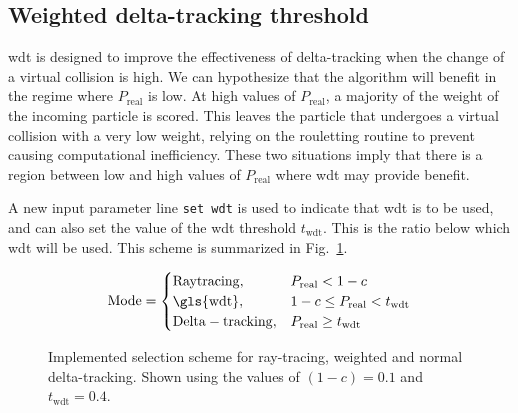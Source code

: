 \subsection{Weighted delta-tracking threshold}
\label{sec:wdt_thresh}

\gls{wdt} is designed to improve the effectiveness of
delta-tracking when the change of a virtual collision is
high. We can hypothesize that the algorithm will benefit in
the regime where $P_{\mathrm{real}}$ is low. At high values of
$P_{\mathrm{real}}$, a majority of the weight of the incoming particle
is scored. This leaves the particle that undergoes a virtual
collision with a very low weight, relying on the rouletting routine to
prevent causing computational inefficiency. These two situations
imply that there is a region between low and high values of
$P_\mathrm{real}$ where \gls{wdt} may provide benefit.

A new input parameter line \verb|set wdt| is used to indicate that
\gls{wdt} is to be used, and can also set the value of the \gls{wdt}
threshold $t_{\mathrm{wdt}}$. This is the ratio below which \gls{wdt} will be used. This
scheme is summarized in Fig.~\ref{fig:ray_wdt}.
\begin{figure}[hbtp]
  \centering
  \begin{align*}
    \mathrm{Mode} =
    \begin{cases}
      \mathrm{Ray tracing}, & P_\mathrm{real} < 1-c \\
      \mathrm{\gls{wdt}}, & 1-c \leq P_\mathrm{real} < t_{\mathrm{wdt}}
      \\
      \mathrm{Delta-tracking}, & P_\mathrm{real} \geq t_{\mathrm{wdt}}
    \end{cases}
  \end{align*}
  \caption[Implemented selection scheme for ray-tracing, weighted and normal
    delta-tracking.]{Implemented selection scheme for ray-tracing, weighted and normal
    delta-tracking. Shown using the values of $(1-c)=0.1$ and $t_{\mathrm{wdt}}=0.4$.}
  \label{fig:ray_wdt}
\end{figure}



